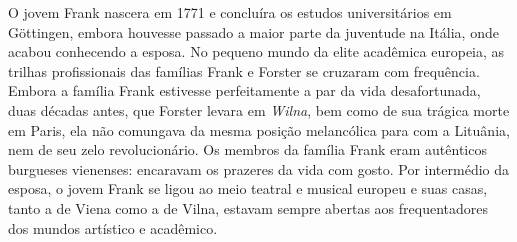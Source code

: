 %

O jovem Frank nascera em 1771 e concluíra os estudos universitários em
Göttingen, embora houvesse passado a maior parte da juventude na Itália,
onde acabou conhecendo a esposa. No pequeno mundo da elite acadêmica
europeia, as trilhas profissionais das famílias Frank e Forster se
cruzaram com frequência. Embora a família Frank estivesse perfeitamente
a par da vida desafortunada, duas décadas antes, que Forster levara em
\textit{Wilna}, bem como de sua trágica morte em Paris, ela não comungava da
mesma posição melancólica para com a Lituânia, nem de seu zelo
revolucionário. Os membros da família Frank eram autênticos burgueses
vienenses: encaravam os prazeres da vida com gosto. Por intermédio da
esposa, o jovem Frank se ligou ao meio teatral e musical europeu e suas
casas, tanto a de Viena como a de Vilna, estavam sempre abertas aos
frequentadores dos mundos artístico e acadêmico.

%

